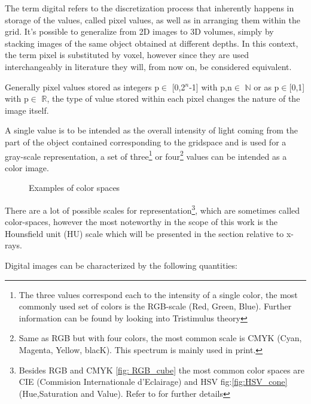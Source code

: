 The term digital refers to the discretization process that inherently happens in storage of the values, called pixel values, as well as in arranging them within the grid. It's possible to generalize from 2D images to 3D volumes, simply by stacking images of the same object obtained at different depths. In this context, the term pixel is substituted by voxel, however since they are used interchangeably in literature they will, from now on, be considered equivalent.

Generally pixel values stored as integers p$\in$ [0,2$^{n}$-1] with p,n$\in$ $\mathbb{N}$  or as p$\in$[0,1] with p$\in$ $\mathbb{R}$, the type of value stored within each pixel changes the nature of the image itself.

A single value is to be intended as the overall intensity of light coming from the part of the object contained corresponding to the gridspace and is used for a gray-scale representation, a set of three\footnote{The three values correspond each to the intensity of a single color, the most commonly used set of colors is the RGB-scale (Red, Green, Blue).
Further information can be found by looking into Tristimulus theory\cite{Tristimulus}}  or four\footnote{Same as RGB but with four colors, the most common scale is CMYK (Cyan, Magenta, Yellow, blacK). This spectrum is mainly used in print.} values can be intended as a color image.

\begin{figure}[H]
     \centering
    \qquad
     \caption{Examples of color spaces}
     \label{fig:color_spaces}
\end{figure}

There are a lot of possible scales for representation\footnote{Besides RGB and CMYK \ref{fig: RGB_cube} the most common color spaces are CIE (Commision Internationale d’Eclairage) and HSV fig:\ref{fig:HSV_cone} (Hue,Saturation and Value). Refer to \cite{Color_spaces} for further details}, which are sometimes called color-spaces, however the most noteworthy in the scope of this work is the Hounsfield unit (HU) scale which will be presented in the section relative to x-rays.

Digital images can be characterized by the following quantities:

